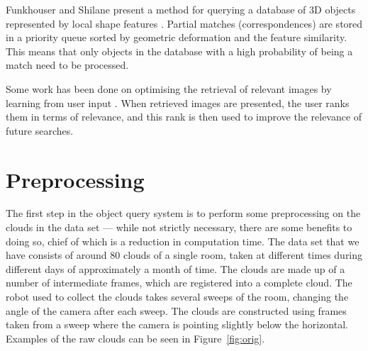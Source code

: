 \documentclass[11pt,a4paper]{kth-mag}
\begin{document}
Funkhouser and Shilane present a method for querying a database of 3D objects
represented by local shape features \cite{funkhouser2006partial}. Partial
matches (correspondences) are stored in a priority queue sorted by geometric
deformation and the feature similarity. This means that only objects in the
database with a high probability of being a match need to be processed.

Some work has been done on optimising the retrieval of relevant images by
learning from user input \cite{rui2000optimizing}. When retrieved images are
presented, the user ranks them in terms of relevance, and this rank is then used
to improve the relevance of future searches.

\chapter{Preprocessing}
\label{chap:preprocess}
The first step in the object query system is to perform some preprocessing on
the clouds in the data set --- while not strictly necessary, there are some
benefits to doing so, chief of which is a reduction in computation time. The
data set that we have consists of around 80 clouds of a single room, taken at
different times during different days of approximately a month of time. The
clouds are made up of a number of intermediate frames, which are registered into
a complete cloud. The robot used to collect the clouds takes several sweeps of
the room, changing the angle of the camera after each sweep. The clouds are
constructed using frames taken from a sweep where the camera is pointing
slightly below the horizontal. Examples of the raw clouds can be seen in
Figure~\ref{fig:orig}.
\end{document}
